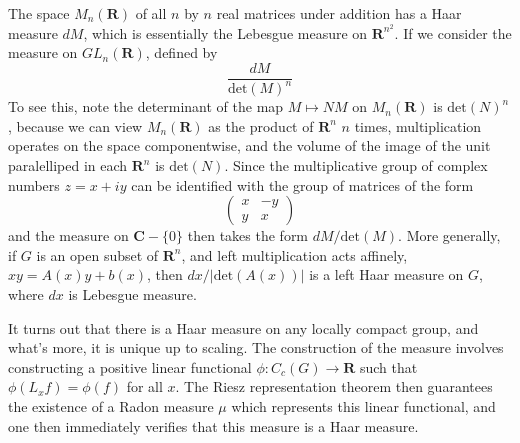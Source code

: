 \begin{example}
    The space $M_n(\mathbf{R})$ of all $n$ by $n$ real matrices under addition has a Haar measure $dM$, which is essentially the Lebesgue measure on $\mathbf{R}^{n^2}$. If we consider the measure on $GL_n(\mathbf{R})$, defined by
    \[ \frac{dM}{\text{det}(M)^n} \]
    To see this, note the determinant of the map $M \mapsto NM$ on $M_n(\mathbf{R})$ is $\text{det}(N)^n$, because we can view $M_n(\mathbf{R})$ as the product of $\mathbf{R}^n$ $n$ times, multiplication operates on the space componentwise, and the volume of the image of the unit paralelliped in each $\mathbf{R}^n$ is $\text{det}(N)$. Since the multiplicative group of complex numbers $z = x + iy$ can be identified with the group of matrices of the form
    \[ \begin{pmatrix} x & -y \\ y & x \end{pmatrix} \]
    and the measure on $\mathbf{C} - \{ 0 \}$ then takes the form $dM/\text{det}(M)$. More generally, if $G$ is an open subset of $\mathbf{R}^n$, and left multiplication acts affinely, $xy = A(x)y + b(x)$, then $dx/|\text{det}(A(x))|$ is a left Haar measure on $G$, where $dx$ is Lebesgue measure.
\end{example}

It turns out that there is a Haar measure on any locally compact group, and what's more, it is unique up to scaling. The construction of the measure involves constructing a positive linear functional $\phi: C_c(G) \to \mathbf{R}$ such that $\phi(L_x f) = \phi(f)$ for all $x$. The Riesz representation theorem then guarantees the existence of a Radon measure $\mu$ which represents this linear functional, and one then immediately verifies that this measure is a Haar measure.

